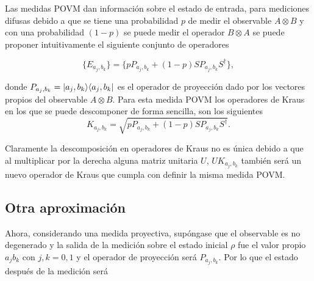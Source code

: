 Las medidas POVM dan información sobre el estado de entrada, para mediciones difusas debido a que se tiene una probabilidad $p$ de medir el observable $A\otimes B$ y con una probabilidad $(1-p)$ se puede medir el operador $B\otimes A$ se puede proponer intuitivamente el siguiente conjunto de operadores

\begin{equation}\{E_{a_j, b_k}\}= \{p P_{a_j,b_k}+(1-p)SP_{a_j,b_k}S^\dagger\},\end{equation}

donde $P_{a_j,b_k} = |a_j, b_k\rangle \langle a_j,b_k|$ es el operador de proyección dado por los vectores propios del observable $A\otimes B$. Para esta medida POVM los operadores de Kraus en los que se puede descomponer de forma sencilla, son los siguientes 
\begin{equation}
K_{a_j, b_k}= \sqrt{p P_{a_j,b_k}+(1-p)SP_{a_j,b_k}S^\dagger}.
\end{equation}

Claramente la descomposición en operadores de Kraus no es única debido a que al multiplicar por la derecha alguna matriz unitaria $U$, $UK_{a_j,b_k}$ también será un nuevo operador de Kraus que cumpla con definir la misma medida POVM\@.



    


\subsection{Otra aproximación}
    Ahora, considerando una medida proyectiva, supóngase que el observable es no degenerado y la salida de la medición sobre el estado inicial $\rho $ fue el valor propio $a_j b_k$ con $j,k=0,1$ y el operador de proyección será $P_{a_j,b_k}$. Por lo que el estado después de la medición será 
    
